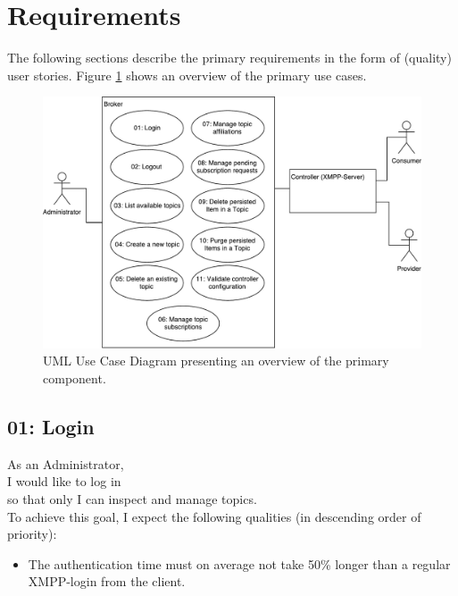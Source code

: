 
\section{Requirements}\label{sec:requirements}

The following sections describe the primary requirements in the form of (quality) user stories.
Figure \ref{fig:requirements-overview} shows an overview of the primary use cases.

\begin{figure}[h]
    \centering
    \includegraphics[width=1\linewidth]{resources/requirements_overview}
    \caption{UML Use Case Diagram presenting an overview of the primary component.}
    \label{fig:requirements-overview}
\end{figure}



\subsection{01: Login}

As an Administrator,\\
I would like to log in\\
so that only I can inspect and manage topics.\\
To achieve this goal, I expect the following qualities (in descending order of priority):

\begin{itemize}
    \item The authentication time must on average not take 50\% longer than a regular XMPP-login from the client.
\end{itemize}

